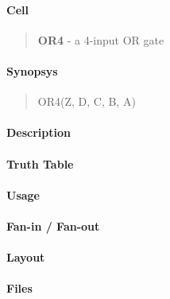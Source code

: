 \label{OR4}
\paragraph{Cell}
\begin{quote}
    \textbf{OR4} - a 4-input OR gate
\end{quote}

\paragraph{Synopsys}
\begin{quote}
    OR4(Z, D, C, B, A)
\end{quote}

\paragraph{Description}

%

\paragraph{Truth Table}
%

\paragraph{Usage}

\paragraph{Fan-in / Fan-out}

\paragraph{Layout}

\paragraph{Files}

\clearpage
